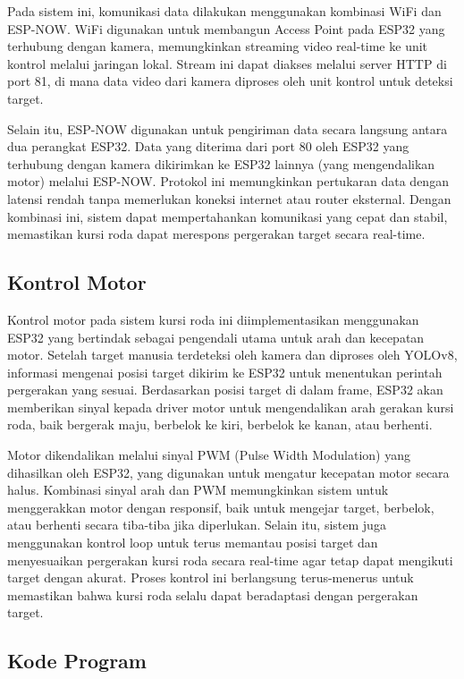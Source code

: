Pada sistem ini, komunikasi data dilakukan menggunakan kombinasi WiFi dan ESP-NOW. WiFi digunakan untuk membangun Access Point pada ESP32 yang terhubung dengan kamera, memungkinkan streaming video real-time ke unit kontrol melalui jaringan lokal. Stream ini dapat diakses melalui server HTTP di port 81, di mana data video dari kamera diproses oleh unit kontrol untuk deteksi target.

Selain itu, ESP-NOW digunakan untuk pengiriman data secara langsung antara dua perangkat ESP32. Data yang diterima dari port 80 oleh ESP32 yang terhubung dengan kamera dikirimkan ke ESP32 lainnya (yang mengendalikan motor) melalui ESP-NOW. Protokol ini memungkinkan pertukaran data dengan latensi rendah tanpa memerlukan koneksi internet atau router eksternal. Dengan kombinasi ini, sistem dapat mempertahankan komunikasi yang cepat dan stabil, memastikan kursi roda dapat merespons pergerakan target secara real-time.

\subsection{Kontrol Motor}
\label{subsec:kontrol_motor}

Kontrol motor pada sistem kursi roda ini diimplementasikan menggunakan ESP32 yang bertindak sebagai pengendali utama untuk arah dan kecepatan motor. Setelah target manusia terdeteksi oleh kamera dan diproses oleh YOLOv8, informasi mengenai posisi target dikirim ke ESP32 untuk menentukan perintah pergerakan yang sesuai. Berdasarkan posisi target di dalam frame, ESP32 akan memberikan sinyal kepada driver motor untuk mengendalikan arah gerakan kursi roda, baik bergerak maju, berbelok ke kiri, berbelok ke kanan, atau berhenti.

Motor dikendalikan melalui sinyal PWM (Pulse Width Modulation) yang dihasilkan oleh ESP32, yang digunakan untuk mengatur kecepatan motor secara halus. Kombinasi sinyal arah dan PWM memungkinkan sistem untuk menggerakkan motor dengan responsif, baik untuk mengejar target, berbelok, atau berhenti secara tiba-tiba jika diperlukan. Selain itu, sistem juga menggunakan kontrol loop untuk terus memantau posisi target dan menyesuaikan pergerakan kursi roda secara real-time agar tetap dapat mengikuti target dengan akurat. Proses kontrol ini berlangsung terus-menerus untuk memastikan bahwa kursi roda selalu dapat beradaptasi dengan pergerakan target.

\subsection{Kode Program}
\label{subsec:kode_program}

